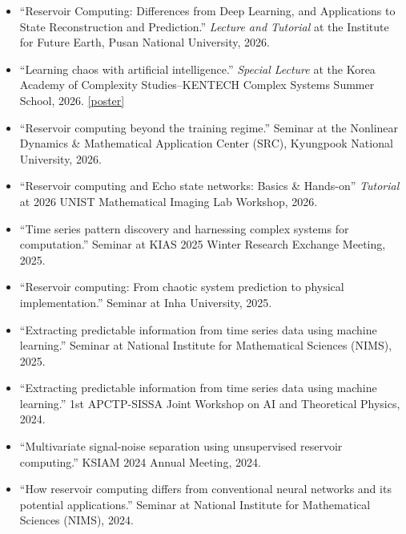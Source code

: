 \documentclass[11pt,a4paper]{article}
\begin{document}
\begin{itemize}[leftmargin=1.5em, topsep=0.2em, itemsep=0.2em]
    \item ``Reservoir Computing: Differences from Deep Learning, and Applications to State Reconstruction and Prediction.'' \textit{Lecture and Tutorial} at the Institute for Future Earth, Pusan National University, 2026.
    
    \item ``Learning chaos with artificial intelligence.'' \textit{Special Lecture} at the Korea Academy of Complexity Studies--KENTECH Complex Systems Summer School, 2026. \href{https://www.complexity.kr/?p=1365}{[poster]}
    
    \item ``Reservoir computing beyond the training regime.'' Seminar at the Nonlinear Dynamics \& Mathematical Application Center (SRC), Kyungpook National University, 2026.
    
    \item ``Reservoir computing and Echo state networks: Basics \& Hands-on'' \textit{Tutorial} at 2026 UNIST Mathematical Imaging Lab Workshop, 2026.
    
    \item ``Time series pattern discovery and harnessing complex systems for computation.'' Seminar at KIAS 2025 Winter Research Exchange Meeting, 2025.
    
    \item ``Reservoir computing: From chaotic system prediction to physical implementation.'' Seminar at Inha University, 2025.
    
    \item ``Extracting predictable information from time series data using machine learning.'' Seminar at National Institute for Mathematical Sciences (NIMS), 2025.
    
    \item ``Extracting predictable information from time series data using machine learning.'' 1st APCTP-SISSA Joint Workshop on AI and Theoretical Physics, 2024.
    
    \item ``Multivariate signal-noise separation using unsupervised reservoir computing.'' KSIAM 2024 Annual Meeting, 2024.
    
    \item ``How reservoir computing differs from conventional neural networks and its potential applications.'' Seminar at National Institute for Mathematical Sciences (NIMS), 2024.
    

\end{itemize}
\end{document}
